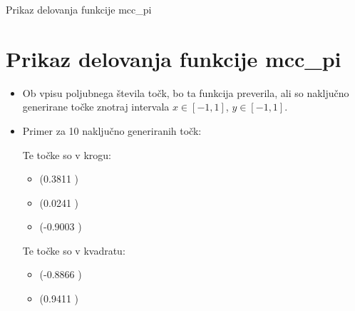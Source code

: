 

\begin{frame}{Prikaz delovanja funkcije mcc\_pi}
\section{Prikaz delovanja funkcije mcc\_pi}

\begin{itemize}
\item Ob vpisu poljubnega števila točk, bo ta funkcija preverila, ali so naključno generirane točke znotraj intervala $x \in [-1,1]$, $y \in [-1,1]$.

\item Primer za 10 naključno generiranih točk:

  Te točke so v krogu:
  \begin{itemize}
    \item (0.3811 )
    \item (0.0241 )
    \item (-0.9003 )
  \end{itemize}

  Te točke so v kvadratu:
  \begin{itemize}
    \item (-0.8866 )
    \item (0.9411 )
  \end{itemize}

\end{itemize}

\end{frame}


